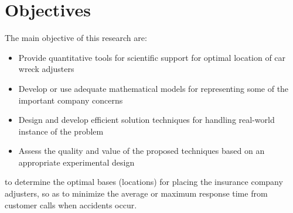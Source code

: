 \section{Objectives}
The main objective
of this research are:
\begin{itemize}
\item Provide quantitative tools
  for scientific support
  for optimal location
  of car wreck adjusters
\item Develop or use
  adequate mathematical models
  for representing
  some of the important company concerns
\item Design and develop efficient solution techniques
  for handling real-world instance of the problem
\item Assess 
  the quality and value of the proposed techniques
  based on an appropriate experimental design
\end{itemize}
to determine the optimal bases (locations)
for placing the insurance company adjusters,
so as to minimize
the average or maximum response time
from customer calls
when accidents occur.
